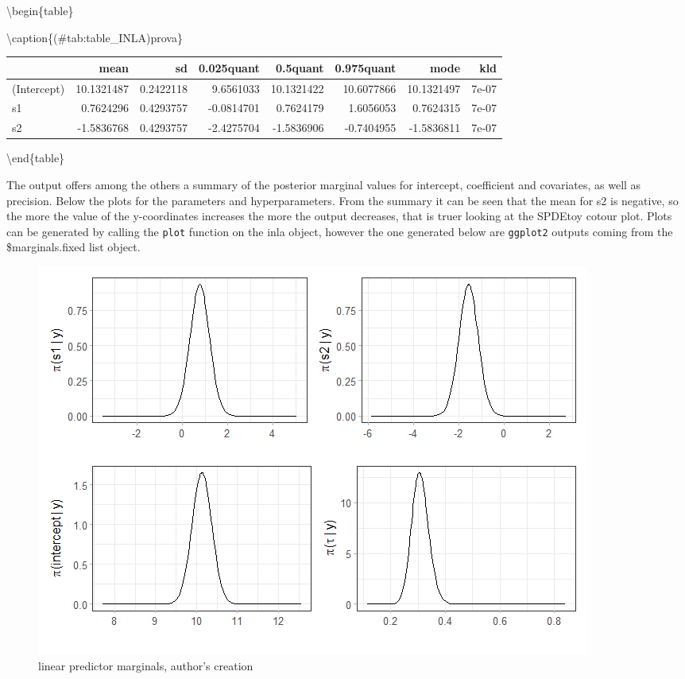 \documentclass[
  12pt,
  a4paper,
  oneside]{book}
\theoremstyle{definition}
\theoremstyle{definition}
\theoremstyle{definition}
\theoremstyle{remark}
\begin{document}
\textbackslash begin\{table\}

\textbackslash caption\{(\#tab:table\_INLA)prova\}
\centering

\begin{tabular}[t]{lrrrrrrr}
\toprule
  & mean & sd & 0.025quant & 0.5quant & 0.975quant & mode & kld\\
\midrule
(Intercept) & 10.1321487 & 0.2422118 & 9.6561033 & 10.1321422 & 10.6077866 & 10.1321497 & 7e-07\\
s1 & 0.7624296 & 0.4293757 & -0.0814701 & 0.7624179 & 1.6056053 & 0.7624315 & 7e-07\\
s2 & -1.5836768 & 0.4293757 & -2.4275704 & -1.5836906 & -0.7404955 & -1.5836811 & 7e-07\\
\bottomrule
\end{tabular}

\textbackslash end\{table\}

The output offers among the others a summary of the posterior marginal values for intercept, coefficient and covariates, as well as precision. Below the plots for the parameters and hyperparameters. From the summary it can be seen that the mean for s2 is negative, so the more the value of the y-coordinates increases the more the output decreases, that is truer looking at the SPDEtoy cotour plot. Plots can be generated by calling the \texttt{plot} function on the inla object, however the one generated below are \texttt{ggplot2} outputs coming from the \$marginals.fixed list object.

\begin{figure}
\centering
\includegraphics{images/marginal_distr.png}
\caption{linear predictor marginals, author's creation}
\end{figure}
\end{document}
